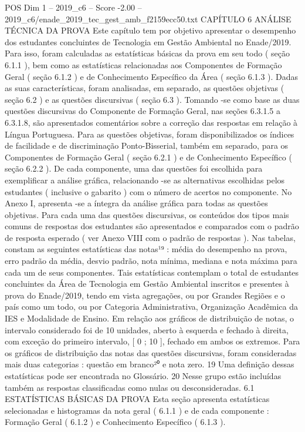 \begin{textsample}{POS Dim 1 – 2019\_c6 – Score -2.00 – 2019\_c6/enade\_2019\_tec\_gest\_amb\_f2159ecc50.txt}  \label{ex:f1_pos_352}
CAPÍTULO 6 ANÁLISE TÉCNICA DA PROVA Este capítulo tem por objetivo apresentar o desempenho dos estudantes concluintes de Tecnologia em Gestão Ambiental no Enade/2019.
Para isso, foram calculadas as estatísticas básicas da prova em seu todo ( seção 6.1.1 ), bem como as estatísticas relacionadas aos Componentes de Formação Geral ( seção 6.1.2 ) e de Conhecimento Específico da Área ( seção 6.1.3 ).
Dadas as suas características, foram analisadas, em separado, as questões objetivas ( seção 6.2 ) e as questões discursivas ( seção 6.3 ).
Tomando -se como base as duas questões discursivas do Componente de Formação Geral, nas seções 6.3.1.5 a 6.3.1.8, são apresentados comentários sobre a correção das respostas em relação à Língua Portuguesa.
Para as questões objetivas, foram disponibilizados os índices de facilidade e de discriminação Ponto-Bisserial, também em separado, para os Componentes de Formação Geral ( seção 6.2.1 ) e de Conhecimento Específico ( seção 6.2.2 ).
De cada componente, uma das questões foi escolhida para exemplificar a análise gráfica, relacionando -se as alternativas escolhidas pelos estudantes ( inclusive o gabarito ) com o número de acertos no componente.
No Anexo I, apresenta -se a íntegra da análise gráfica para todas as questões objetivas.
Para cada uma das questões discursivas, os conteúdos dos tipos mais comuns de respostas dos estudantes são apresentados e comparados com o padrão de resposta esperado ( ver Anexo VIII com o padrão de respostas ).
Nas tabelas, constam as seguintes estatísticas das notas¹⁹ : média do desempenho na prova, erro padrão da média, desvio padrão, nota mínima, mediana e nota máxima para cada um de seus componentes.
Tais estatísticas contemplam o total de estudantes concluintes da Área de Tecnologia em Gestão Ambiental inscritos e presentes à prova do Enade/2019, tendo em vista agregações, ou por Grandes Regiões e o país como um todo, ou por Categoria Administrativa, Organização Acadêmica da IES e Modalidade de Ensino.
Em relação aos gráficos de distribuição de notas, o intervalo considerado foi de 10 unidades, aberto à esquerda e fechado à direita, com exceção do primeiro intervalo, [ 0 ; 10 ], fechado em ambos os extremos.
Para os gráficos de distribuição das notas das questões discursivas, foram consideradas mais duas categorias : questão em branco²⁰ e nota zero. 19 Uma definição dessas estatísticas pode ser encontrada no Glossário. 20 Nesse grupo estão incluídas também as respostas classificadas como nulas ou desconsideradas. 6.1 ESTATÍSTICAS BÁSICAS DA PROVA Esta seção apresenta estatísticas selecionadas e histogramas da nota geral ( 6.1.1 ) e de cada componente : Formação Geral ( 6.1.2 ) e Conhecimento Específico ( 6.1.3 ).

\end{textsample}
